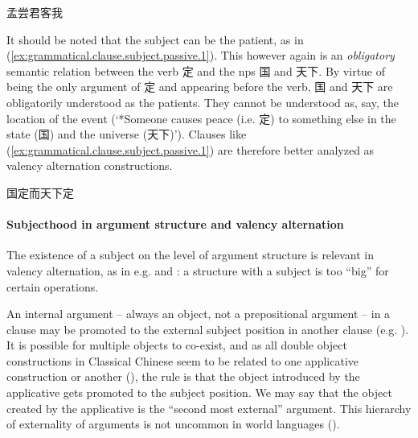 \documentclass[UTF8, a4paper, oneside, scheme=plain, 12pt]{ctexrep}
\newcommand{\translate}[1]{`#1'}
\begin{document}
\begin{exe}
    \ex\label{ex:grammatical.clause.subject.causative.1} 孟尝君客我 
\end{exe}

It should be noted that the subject can be the patient,
as in (\ref{ex:grammatical.clause.subject.passive.1}).
This however again is an \emph{obligatory} semantic relation
between the verb 定 and the \ac{np}s 国 and 天下.
By virtue of being the only argument of 定 and appearing before the verb,
国 and 天下 are obligatorily understood as the patients.
They cannot be understood as, say, the location of the event
(\translate{*Someone causes peace (i.e. 定) to something else in the state (国) and the universe (天下)}).
Clauses like (\ref{ex:grammatical.clause.subject.passive.1})
are therefore better analyzed as valency alternation constructions.

\begin{exe}
    \ex\label{ex:grammatical.clause.subject.passive.1} 国定而天下定
\end{exe}

\paragraph{Subjecthood in argument structure and valency alternation}
\label{sec:grammatical.verbal.subject.argument-structure.alternation}
The existence of a subject on the level of argument structure 
is relevant in valency alternation, as in
e.g. 
and :
a structure with a subject is too ``big'' for certain operations.

An internal argument -- always an object, not a prepositional argument -- in a clause
may be promoted to the external subject position in another clause
(e.g. ).
It is possible for multiple objects to co-exist,
and as all double object constructions in Classical Chinese
seem to be related to one applicative construction or another
(),
the rule is that the object introduced by the applicative gets promoted to the subject position.
We may say that the object created by the applicative is the ``second most external'' argument.
This hierarchy of externality of arguments is not uncommon in world languages
().
\end{document}

